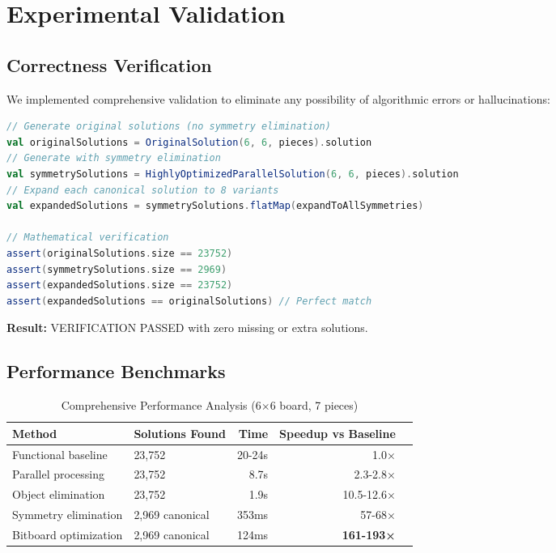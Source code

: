 \documentclass[12pt,a4paper]{article}
\theoremstyle{definition}
\begin{document}
\section{Experimental Validation}

\subsection{Correctness Verification}

We implemented comprehensive validation to eliminate any possibility of algorithmic errors or hallucinations:

\begin{lstlisting}[language=Scala, caption=Symmetry Verification Test]
// Generate original solutions (no symmetry elimination)
val originalSolutions = OriginalSolution(6, 6, pieces).solution
// Generate with symmetry elimination  
val symmetrySolutions = HighlyOptimizedParallelSolution(6, 6, pieces).solution
// Expand each canonical solution to 8 variants
val expandedSolutions = symmetrySolutions.flatMap(expandToAllSymmetries)

// Mathematical verification
assert(originalSolutions.size == 23752)
assert(symmetrySolutions.size == 2969) 
assert(expandedSolutions.size == 23752)
assert(expandedSolutions == originalSolutions) // Perfect match
\end{lstlisting}

\textbf{Result:} VERIFICATION PASSED with zero missing or extra solutions.

\subsection{Performance Benchmarks}

\begin{table}[h]
\centering
\caption{Comprehensive Performance Analysis (6$\times$6 board, 7 pieces)}
\begin{tabular}{@{}llrrr@{}}
\toprule
Method & Solutions Found & Time & Speedup vs Baseline \\
\midrule
Functional baseline & 23,752 & 20-24s & 1.0× \\
Parallel processing & 23,752 & 8.7s & 2.3-2.8× \\
Object elimination & 23,752 & 1.9s & 10.5-12.6× \\
Symmetry elimination & 2,969 canonical & 353ms & 57-68× \\
Bitboard optimization & 2,969 canonical & 124ms & \textbf{161-193×} \\
\bottomrule
\end{tabular}
\end{table}
\end{document}
